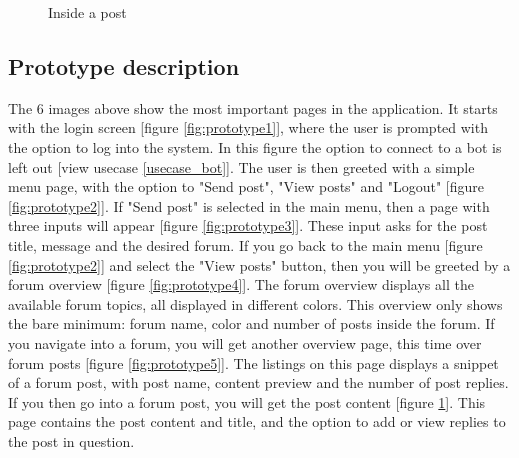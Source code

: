\begin{table}[H]
\begin{minipage}{.33\textwidth}
\begin{figure}[H]
            \caption{Inside a post}
            \label{fig:prototype6}
        \end{figure}
    \end{minipage}
    \label{fig:prototype}
\end{table}
\newpage
\subsection{Prototype description}
The 6 images above show the most important pages in the application. It starts with the login screen [figure \ref{fig:prototype1}], where the user is prompted with the option to log into the system. In this figure the option to connect to a bot is left out [view usecase \ref{usecase_bot}]. The user is then greeted with a simple menu page, with the option to "Send post", "View posts" and "Logout" [figure \ref{fig:prototype2}]. If "Send post" is selected in the main menu, then a page with three inputs will appear [figure \ref{fig:prototype3}]. These input asks for the post title, message and the desired forum. If you go back to the main menu [figure \ref{fig:prototype2}] and select the "View posts" button, then you will be greeted by a forum overview [figure \ref{fig:prototype4}]. The forum overview displays all the available forum topics, all displayed in different colors. This overview only shows the bare minimum: forum name, color and number of posts inside the forum. If you navigate into a forum, you will get another overview page, this time over forum posts [figure \ref{fig:prototype5}]. The listings on this page displays a snippet of a forum post, with post name, content preview and the number of post replies. If you then go into a forum post, you will get the post content [figure \ref{fig:prototype6}]. This page contains the post content and title, and the option to add or view replies to the post in question.